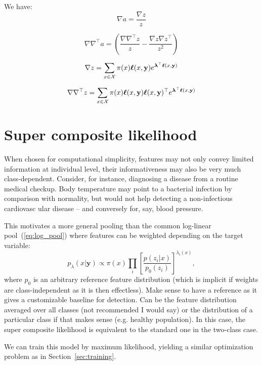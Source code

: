 \documentclass[english]{scrartcl}
\def\y{{\mathbf{y}}}
\newcommand{\blambda}{{\boldsymbol{\lambda}}}
\newcommand{\bell}{{\boldsymbol{\ell}}}
\begin{document}
We have:
$$
\nabla a = \frac{\nabla z}{z}
$$

$$
\nabla\nabla^\top a 
= \left(
\frac{\nabla \nabla^\top z}{z} 
- \frac{\nabla z \nabla z^\top}{z^2}
\right)
$$

$$
\nabla z 
=
\sum_{x\in{\cal X}} \pi(x) \bell(x,\y)  e^{\blambda^\top \bell(x,\y)}
$$

$$
\nabla \nabla^\top z 
=
\sum_{x\in{\cal X}} \pi(x) \bell(x,\y) \bell(x,\y)^\top e^{\blambda^\top \bell(x,\y)}
$$


\section{Super composite likelihood}
\label{appendix:super}

When chosen for computational simplicity, features may not only convey limited information at individual level, their informativeness may also be very much class-dependent. Consider, for instance, diagnosing a disease from a routine medical checkup. Body temperature may point to a bacterial infection by comparison with normality, but would not help detecting a non-infectious cardiovasc ular disease -- and conversely for, say, blood pressure. 

This motivates a more general pooling than the common log-linear pool~(\ref{eq:log_pool}) where features can be weighted depending on the target variable:
$$
p_\lambda(x|\y) \propto \pi(x) \prod_i \left[\frac{p(z_i|x)}{p_0(z_i)}\right]^{\lambda_i(x)},
$$
where $p_0$ is an arbitrary reference feature distribution (which is implicit if weights are class-independent as it is then effectless). Make sense to have a reference as it gives a customizable baseline for detection. Can be the feature distribution averaged over all classes (not recommended I would say) or the distribution of a particular class if that makes sense (e.g. healthy population). In this case, the super composite likelihood is equivalent to the standard one in the two-class case.

We can train this model by maximum likelihood, yielding a similar optimization problem as in Section~\ref{sec:training}. 

\end{document}
